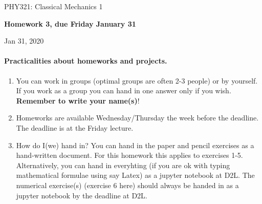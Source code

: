 \documentclass[%
oneside,                 %
final,                   %
10pt]{article}
\begin{document}

\newcommand{\exercisesection}[1]{\subsection*{#1}}






\thispagestyle{empty}

\begin{center}
{\LARGE\bf
\begin{spacing}{1.25}
PHY321: Classical Mechanics 1
\end{spacing}
}
\end{center}


\begin{center}
{\bf Homework 3, due Friday January 31${}^{}$} \\ [0mm]
\end{center}

\begin{center}
\end{center}
    

\begin{center}
Jan 31, 2020
\end{center}

\vspace{1cm}


\paragraph{Practicalities about  homeworks and projects.}
\begin{enumerate}
\item You can work in groups (optimal groups are often 2-3 people) or by yourself. If you work as a group you can hand in one answer only if you wish. \textbf{Remember to write your name(s)}!

\item Homeworks are available Wednesday/Thursday the week before the deadline. The deadline is at the Friday lecture.

\item How do I(we)  hand in?  You can hand in the paper and pencil exercises as a hand-written document. For this homework this applies to exercises 1-5. Alternatively, you can hand in everyhting (if you are ok with typing mathematical formulae using say Latex) as a jupyter notebook at D2L. The numerical exercise(s) (exercise 6 here) should always be handed in as a jupyter notebook by the deadline at D2L. 
\end{enumerate}
\end{document}
